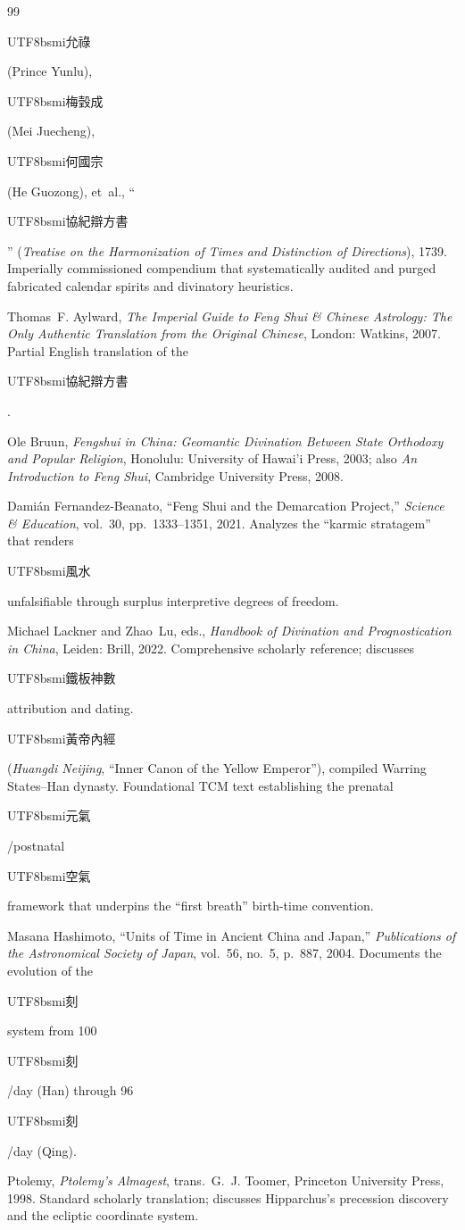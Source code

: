 \documentclass[10pt,a4paper]{article}
\newcommand{\zh}[1]{\begin{CJK}{UTF8}{bsmi}#1\end{CJK}}
\begin{document}
\begin{sloppypar}
\begin{thebibliography}{99}
\zh{允祿} (Prince Yunlu), \zh{梅瑴成} (Mei Juecheng),
\zh{何國宗} (He Guozong), et~al., ``\zh{協紀辯方書}''
(\textit{Treatise on the Harmonization of Times and Distinction of
Directions}), 1739. Imperially commissioned compendium that
systematically audited and purged fabricated calendar spirits and
divinatory heuristics.

Thomas~F. Aylward, \textit{The Imperial Guide to Feng Shui \&
Chinese Astrology: The Only Authentic Translation from the Original
Chinese}, London: Watkins, 2007. Partial English translation of the
\zh{協紀辯方書}.

Ole Bruun, \textit{Fengshui in China: Geomantic Divination Between
State Orthodoxy and Popular Religion}, Honolulu: University of
Hawai'i Press, 2003; also \textit{An Introduction to Feng Shui},
Cambridge University Press, 2008.

Dami\'{a}n Fernandez-Beanato, ``Feng Shui and the Demarcation
Project,'' \textit{Science \& Education}, vol.~30, pp.~1333--1351,
2021. Analyzes the ``karmic stratagem'' that renders \zh{風水}
unfalsifiable through surplus interpretive degrees of freedom.

Michael Lackner and Zhao~Lu, eds., \textit{Handbook of Divination
and Prognostication in China}, Leiden: Brill, 2022. Comprehensive
scholarly reference; discusses \zh{鐵板神數} attribution and
dating.

\zh{黃帝內經} (\textit{Huangdi Neijing}, ``Inner Canon of the
Yellow Emperor''), compiled Warring States--Han dynasty. Foundational
TCM text establishing the prenatal \zh{元氣}/postnatal \zh{空氣}
framework that underpins the ``first breath'' birth-time convention.

Masana Hashimoto, ``Units of Time in Ancient China and Japan,''
\textit{Publications of the Astronomical Society of Japan},
vol.~56, no.~5, p.~887, 2004. Documents the evolution of the
\zh{刻} system from 100~\zh{刻}/day (Han) through 96~\zh{刻}/day
(Qing).


Ptolemy, \textit{Ptolemy's Almagest}, trans.\ G.~J. Toomer,
Princeton University Press, 1998. Standard scholarly translation;
discusses Hipparchus's precession discovery and the ecliptic
coordinate system.


\end{thebibliography}
\end{sloppypar}
\end{document}
